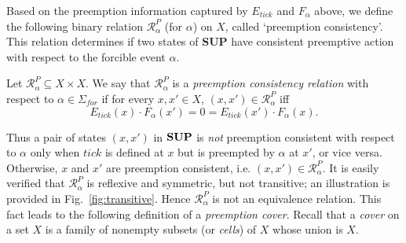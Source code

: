 \documentclass[twocolumn]{autart}
\begin{document}
Based on the preemption information captured by $E_{tick}$ and
$F_{\alpha}$ above, we define the following binary relation
$\mathcal{R}^P_{\alpha}$ (for $\alpha$) on $X$, called `preemption
consistency'. { This relation determines if two states of
{\bf SUP} have consistent preemptive action with respect to the
forcible event $\alpha$.}

\begin{defn} \label{def1}
Let $\mathcal{R}^P_{\alpha} \subseteq X \times X$. We say that
$\mathcal{R}^P_{\alpha}$ is a {\it preemption consistency relation}
with respect to $\alpha \in \Sigma_{for}$ if for every $x,x' \in X$,
$(x,x')\in \mathcal{R}^P_{\alpha}$ iff \begin{equation} \label{e25}
E_{tick}(x)\cdot F_\alpha(x') = 0 = E_{tick}(x')\cdot F_\alpha(x).
\end{equation}
\end{defn}

Thus a pair of states $(x,x')$ in ${\bf SUP}$ is \emph{not}
preemption consistent with respect to $\alpha$ only when $tick$ is
defined at $x$ but is preempted by $\alpha$ at $x'$, or vice versa.
Otherwise, $x$ and $x'$ are preemption consistent, i.e. $(x,x') \in
\mathcal{R}^P_{\alpha}$. It is easily verified that
$\mathcal{R}^P_{\alpha}$ is reflexive and symmetric, but not
transitive; an illustration is provided in Fig.~\ref{fig:transitive}. Hence
$\mathcal{R}^P_{\alpha}$ is not an equivalence relation. This fact
leads to the following definition of a {\it preemption cover}.
Recall that a {\it cover} on a set $X$ is a family of nonempty
subsets (or {\it cells}) of $X$ whose union is $X$.
\end{document}
